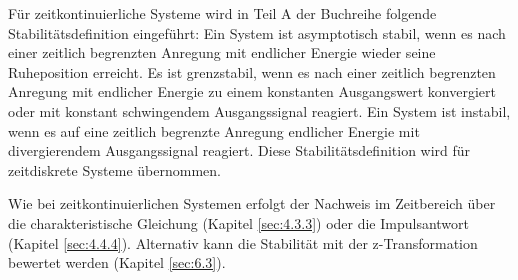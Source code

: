 Für zeitkontinuierliche Systeme wird in Teil A der Buchreihe folgende Stabilitätsdefinition eingeführt: Ein System ist asymptotisch stabil, wenn es nach einer zeitlich begrenzten Anregung mit endlicher Energie wieder seine Ruheposition erreicht. Es ist grenzstabil, wenn es nach einer zeitlich begrenzten Anregung mit endlicher Energie zu einem konstanten Ausgangswert konvergiert oder mit konstant schwingendem Ausgangssignal reagiert. Ein System ist instabil, wenn es auf eine zeitlich begrenzte Anregung endlicher Energie mit divergierendem Ausgangssignal reagiert. Diese Stabilitätsdefinition wird für zeitdiskrete Systeme übernommen.

Wie bei zeitkontinuierlichen Systemen erfolgt der Nachweis im Zeitbereich über die charakteristische Gleichung (Kapitel \ref{sec:4.3.3}) oder die Impulsantwort (Kapitel \ref{sec:4.4.4}). Alternativ kann die Stabilität mit der z-Transformation bewertet werden (Kapitel \ref{sec:6.3}).

